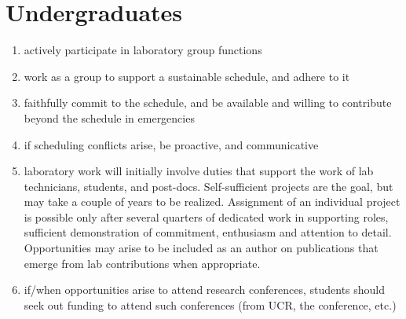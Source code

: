 \documentclass[12pt]{article}
\begin{document}
\section{Undergraduates}
\begin{enumerate}
\item actively participate in laboratory group functions
\item work as a group to support a sustainable schedule, and adhere to
  it
\item faithfully commit to the schedule, and be available and willing
  to contribute beyond the schedule in emergencies
\item if scheduling conflicts arise, be proactive, and communicative
\item laboratory work will initially involve duties that support the
  work of lab technicians, students, and post-docs. Self-sufficient
  projects are the goal, but may take a couple of years to be
  realized. Assignment of an individual project is possible only after
  several quarters of dedicated work in supporting roles, sufficient
  demonstration of commitment, enthusiasm and attention to
  detail. Opportunities may arise to be included as an author on
  publications that emerge from lab contributions when appropriate.
\item if/when opportunities arise to attend research conferences, students
  should seek out funding to attend such conferences (from UCR, the
  conference, etc.)
\end{enumerate}
\end{document}
